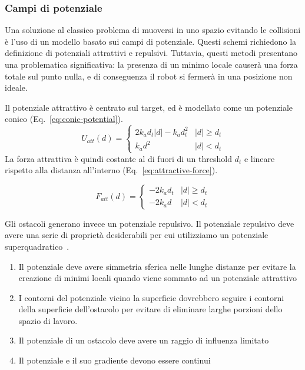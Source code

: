 \documentclass[a4paper]{article}
\begin{document}
	\subsubsection{Campi di potenziale}\label{subsec:Campi-di-potenziale}
	
	Una soluzione al classico problema di muoversi in uno spazio evitando le
	collisioni è l'uso di un modello basato sui campi di potenziale. Questi
	schemi richiedono la definizione di potenziali attrattivi e repulsivi.
	Tuttavia, questi metodi presentano una problematica significativa: la
	presenza di un minimo locale causerà una forza totale sul punto nulla, e di
	conseguenza il robot si fermerà in una posizione non ideale. 
	
	Il potenziale attrattivo è centrato sul target, ed è modellato come un
	potenziale conico (Eq.~\ref{eq:conic-potential}).
	\begin{equation}\label{eq:conic-potential}
		U_{att}(d) = \begin{cases}
			2k_ad_t\left| d \right| -k_ad_t^2 	& \left| d \right| \ge d_t\\
			k_ad^2 								& \left| d \right| < d_t 
		\end{cases}
	\end{equation}
	La forza attrattiva è quindi costante al di fuori di un threshold $
	d_t $ e lineare rispetto alla distanza all'interno
	(Eq.~\ref{eq:attractive-force}).

	\begin{equation}\label{eq:attractive-force}
		F_{att}(d) = 
		\begin{cases}
			-2k_ad_t & \left| d \right| \ge d_t\\
			-2k_ad  & \left| d \right| < d_t 
		\end{cases}
	\end{equation}


	Gli ostacoli generano invece un potenziale repulsivo. Il potenziale
	repulsivo deve avere una serie di proprietà desiderabili per cui
	utilizziamo un potenziale superquadratico~\cite{volpe1990manipulator}.
	\begin{enumerate}
		\item Il potenziale deve avere simmetria sferica nelle lunghe distanze
			per evitare la creazione di minimi locali quando viene sommato ad
			un potenziale attrattivo
		\item I contorni del potenziale vicino la superficie dovrebbero seguire
			i contorni della superficie dell'ostacolo per evitare di eliminare
			larghe porzioni dello spazio di lavoro.
		\item Il potenziale di un ostacolo deve avere un raggio di influenza
			limitato
		\item Il potenziale e il suo gradiente devono essere continui
	\end{enumerate}
\end{document}
